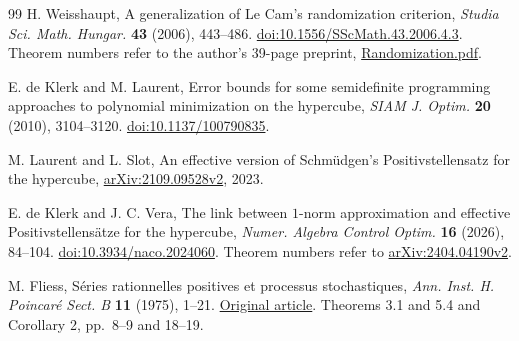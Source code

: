 \begin{thebibliography}{99}
H. Weisshaupt, A generalization of Le Cam's randomization criterion,
\emph{Studia Sci. Math. Hungar.} \textbf{43} (2006), 443--486.
\href{https://doi.org/10.1556/SScMath.43.2006.4.3}{doi:10.1556/SScMath.43.2006.4.3}.
Theorem numbers refer to the author's 39-page preprint,
\href{https://www.weiszhaupt.at/publications/Randomization.pdf}{Randomization.pdf}.


E. de Klerk and M. Laurent, Error bounds for some semidefinite
programming approaches to polynomial minimization on the hypercube,
\emph{SIAM J. Optim.} \textbf{20} (2010), 3104--3120.
\href{https://doi.org/10.1137/100790835}{doi:10.1137/100790835}.


M. Laurent and L. Slot, An effective version of Schm\"udgen's
Positivstellensatz for the hypercube,
\href{https://arxiv.org/abs/2109.09528v2}{arXiv:2109.09528v2}, 2023.


E. de Klerk and J. C. Vera, The link between $1$-norm approximation
and effective Positivstellens\"atze for the hypercube,
\emph{Numer. Algebra Control Optim.} \textbf{16} (2026), 84--104.
\href{https://doi.org/10.3934/naco.2024060}{doi:10.3934/naco.2024060}.
Theorem numbers refer to
\href{https://arxiv.org/abs/2404.04190v2}{arXiv:2404.04190v2}.

M. Fliess, S\'eries rationnelles positives et processus stochastiques,
\emph{Ann. Inst. H. Poincar\'e Sect. B} \textbf{11} (1975), 1--21.
\href{https://www.numdam.org/item/AIHPB_1975__11_1_1_0/}{Original article}.
Theorems 3.1 and 5.4 and Corollary 2, pp.~8--9 and 18--19.

\end{thebibliography}

